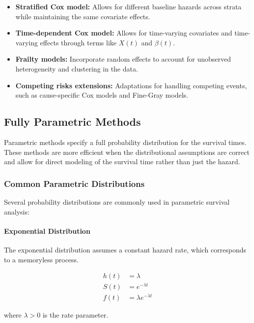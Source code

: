 \begin{itemize}
    \item \textbf{Stratified Cox model:} Allows for different baseline hazards across strata while maintaining the same covariate effects.

    \item \textbf{Time-dependent Cox model:} Allows for time-varying covariates and time-varying effects through terms like $X(t)$ and $\beta(t)$.

    \item \textbf{Frailty models:} Incorporate random effects to account for unobserved heterogeneity and clustering in the data.

    \item \textbf{Competing risks extensions:} Adaptations for handling competing events, such as cause-specific Cox models and Fine-Gray models.
\end{itemize}

\subsection{Fully Parametric Methods}

Parametric methods specify a full probability distribution for the survival times. These methods are more efficient when the distributional assumptions are correct and allow for direct modeling of the survival time rather than just the hazard.

\subsubsection{Common Parametric Distributions}

Several probability distributions are commonly used in parametric survival analysis:

\paragraph{Exponential Distribution}
The exponential distribution assumes a constant hazard rate, which corresponds to a memoryless process.

\begin{equationbox}[title=Exponential Distribution]
\begin{align}
h(t) &= \lambda\\
S(t) &= e^{-\lambda t}\\
f(t) &= \lambda e^{-\lambda t}
\end{align}

where $\lambda > 0$ is the rate parameter.
\end{equationbox}

